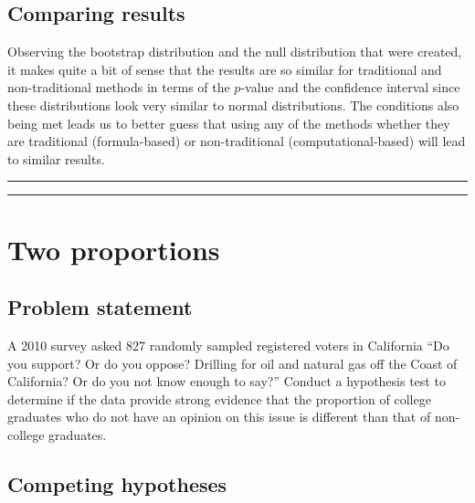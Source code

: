 \documentclass[12pt, krantz2,]{krantz}
\begin{document}
\hypertarget{comparing-results-1}{%
\subsection{Comparing results}\label{comparing-results-1}}

Observing the bootstrap distribution and the null distribution that were created, it makes quite a bit of sense that the results are so similar for traditional and non-traditional methods in terms of the \(p\)-value and the confidence interval since these distributions look very similar to normal distributions. The conditions also being met leads us to better guess that using any of the methods whether they are traditional (formula-based) or non-traditional (computational-based) will lead to similar results.

\begin{center}\rule{0.5\linewidth}{\linethickness}\end{center}

\begin{center}\rule{0.5\linewidth}{\linethickness}\end{center}

\hypertarget{two-proportions}{%
\section{Two proportions}\label{two-proportions}}

\hypertarget{problem-statement-2}{%
\subsection{Problem statement}\label{problem-statement-2}}

A 2010 survey asked 827 randomly sampled registered voters
in California ``Do you support? Or do you oppose? Drilling for oil and natural gas off the Coast of
California? Or do you not know enough to say?'' Conduct a hypothesis test to determine if the data
provide strong evidence that the proportion of college
graduates who do not have an opinion on this issue is
different than that of non-college graduates. \citep[Tweaked a bit from][ {[}Chapter 6{]}]{isrs2014}

\hypertarget{competing-hypotheses-2}{%
\subsection{Competing hypotheses}\label{competing-hypotheses-2}}
\end{document}
